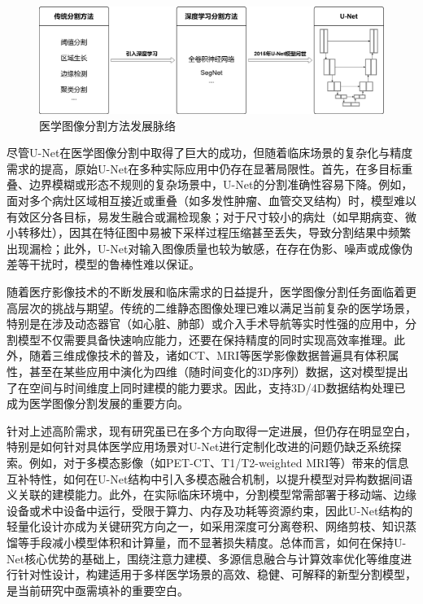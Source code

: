 \begin{figure}[h]
    \centering
    \includegraphics[width=\textwidth]{fig/分割方法发展.png}
    \caption{医学图像分割方法发展脉络}
    \label{develop_seg}
\end{figure}

尽管U-Net在医学图像分割中取得了巨大的成功，但随着临床场景的复杂化与精度需求的提高，原始U-Net在多种实际应用中仍存在显著局限性。首先，在多目标重叠、边界模糊或形态不规则的复杂场景中，U-Net的分割准确性容易下降。例如，面对多个病灶区域相互接近或重叠（如多发性肿瘤、血管交叉结构）时，模型难以有效区分各目标，易发生融合或漏检现象；对于尺寸较小的病灶（如早期病变、微小转移灶），因其在特征图中易被下采样过程压缩甚至丢失，导致分割结果中频繁出现漏检；此外，U-Net对输入图像质量也较为敏感，在存在伪影、噪声或成像伪差等干扰时，模型的鲁棒性难以保证\cite{azad2024}。

随着医疗影像技术的不断发展和临床需求的日益提升，医学图像分割任务面临着更高层次的挑战与期望。传统的二维静态图像处理已难以满足当前复杂的医学场景，特别是在涉及动态器官（如心脏、肺部）或介入手术导航等实时性强的应用中，分割模型不仅需要具备快速响应能力，还要在保持精度的同时实现高效率推理。此外，随着三维成像技术的普及，诸如CT、MRI等医学影像数据普遍具有体积属性，甚至在某些应用中演化为四维（随时间变化的3D序列）数据，这对模型提出了在空间与时间维度上同时建模的能力要求。因此，支持3D/4D数据结构处理已成为医学图像分割发展的重要方向。

针对上述高阶需求，现有研究虽已在多个方向取得一定进展，但仍存在明显空白，特别是如何针对具体医学应用场景对U-Net进行定制化改进的问题仍缺乏系统探索\cite{krithikaaliasanbudevi2022}。例如，对于多模态影像（如PET-CT、T1/T2-weighted MRI等）带来的信息互补特性，如何在U-Net结构中引入多模态融合机制，以提升模型对异构数据间语义关联的建模能力。此外，在实际临床环境中，分割模型常需部署于移动端、边缘设备或术中设备中运行，受限于算力、内存及功耗等资源约束，因此U-Net结构的轻量化设计亦成为关键研究方向之一，如采用深度可分离卷积、网络剪枝、知识蒸馏等手段减小模型体积和计算量，而不显著损失精度。总体而言，如何在保持U-Net核心优势的基础上，围绕注意力建模、多源信息融合与计算效率优化等维度进行针对性设计，构建适用于多样医学场景的高效、稳健、可解释的新型分割模型，是当前研究中亟需填补的重要空白。

